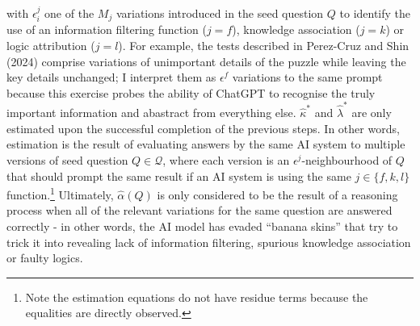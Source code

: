 \documentclass[
]{article}
\begin{document}
with \(\epsilon_i^j\) one of the \(M_j\) variations introduced in the
seed question \(Q\) to identify the use of an information filtering
function (\(j=f\)), knowledge association (\(j=k\)) or logic attribution
(\(j=l\)). For example, the tests described in Perez-Cruz and Shin
(2024) comprise variations of unimportant details of the puzzle while
leaving the key details unchanged; I interpret them as \(\epsilon^f\)
variations to the same prompt because this exercise probes the ability
of ChatGPT to recognise the truly important information and abastract
from everything else. \(\hat{\kappa}^*\) and \(\hat{\lambda}^*\) are
only estimated upon the successful completion of the previous steps. In
other words, estimation is the result of evaluating answers by the same
AI system to multiple versions of seed question \(Q \in \mathcal{Q}\),
where each version is an \(\epsilon^j\)-neighbourhood of \(Q\) that
should prompt the same result if an AI system is using the same
\(j \in \{f, k, l\}\) function.\footnote{Note the estimation equations
  do not have residue terms because the equalities are directly
  observed.} Ultimately, \(\hat{\alpha}(Q)\) is only considered to be
the result of a reasoning process when all of the relevant variations
for the same question are answered correctly - in other words, the AI
model has evaded ``banana skins'' that try to trick it into revealing
lack of information filtering, spurious knowledge association or faulty
logics.
\end{document}
